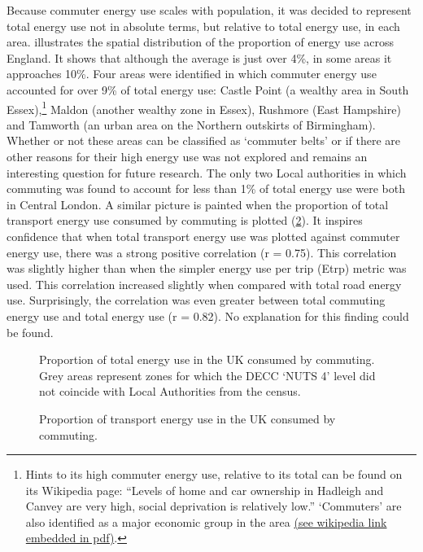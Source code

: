 Because commuter energy use scales with population, it was decided to represent
total energy use not in absolute terms, but relative to total energy use,
in each area.  illustrates the spatial distribution of
the proportion of energy use across England. It shows that although the
average is just over 4\%, in some areas it approaches 10\%. Four areas
were identified in which commuter energy use accounted for over 9\% of total
energy use: Castle Point (a wealthy area in South
Essex),\footnote{Hints to its high commuter energy use, relative to its total
can be found on its Wikipedia page:
``Levels of home and car ownership in Hadleigh and Canvey are very high,
social deprivation is relatively low.'' `Commuters' are also
identified as a major economic group in the area {\color{blue}
\href{http://tinyurl.com/qfkb9ta}
{(see wikipedia link embedded in pdf)}}.
}
Maldon (another wealthy zone in Essex),
Rushmore (East Hampshire) and Tamworth (an urban area on the Northern
outskirts of Birmingham). Whether or not these areas can be classified as
`commuter belts' or if there are other reasons for their high energy use was
not explored and remains an interesting question for future research.
The only two Local authorities in which commuting was found to account
for less than 1\% of total energy use were both in Central London.
A similar picture is painted when the proportion of total transport
energy use consumed by commuting is plotted (\cref{fproptrans}).
It inspires confidence that when total transport energy use was plotted
against commuter energy use, there was a strong positive correlation
(r = 0.75). This correlation was slightly higher than when
the simpler energy use per trip (Etrp) metric was used.
This correlation increased slightly when compared with
total road energy use. Surprisingly, the correlation
was even greater between total commuting energy use and total energy use
(r = 0.82). No explanation for this finding could be found.

\begin{figure}
 \caption[Proportion of total energy use in the UK consumed by commuting]
 {Proportion of total energy use in the UK consumed by commuting.
 Grey areas represent zones for which the DECC `NUTS 4' level did not coincide with
 Local Authorities from the census.
 }
 \label{fpropten}
\end{figure}

\begin{figure}
 \caption{Proportion of transport energy use in the UK consumed by commuting.}
 \label{fproptrans}
\end{figure}


